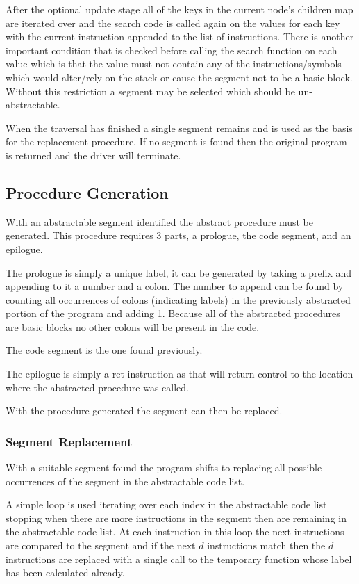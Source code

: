 \documentclass[9pt,nocopyrightspace]{sigplanconf}
\begin{document}
After the optional update stage all of the keys in the current node's children map are iterated over and the search code is called again on the values for each key with the current instruction appended to the list of instructions.
There is another important condition that is checked before calling the search function on each value which is that the value must not contain any of the instructions/symbols which would alter/rely on the stack or cause the segment not to be a basic block.
Without this restriction a segment may be selected which should be un-abstractable.

When the traversal has finished a single segment remains and is used as the basis for the replacement procedure.
If no segment is found then the original program is returned and the driver will terminate.

\subsection{Procedure Generation}

With an abstractable segment identified the abstract procedure must be generated.
This procedure requires 3 parts, a prologue, the code segment, and an epilogue.

The prologue is simply a unique label, it can be generated by taking a prefix and appending to it a number and a colon.
The number to append can be found by counting all occurrences of colons (indicating labels) in the previously abstracted portion of the program and adding 1.
Because all of the abstracted procedures are basic blocks no other colons will be present in the code.

The code segment is the one found previously.

The epilogue is simply a ret instruction as that will return control to the location where the abstracted procedure was called.

With the procedure generated the segment can then be replaced.

\subsubsection{Segment Replacement}

With a suitable segment found the program shifts to replacing all possible occurrences of the segment in the abstractable code list.

A simple loop is used iterating over each index in the abstractable code list stopping when there are more instructions in the segment then are remaining in the abstractable code list.
At each instruction in this loop the next instructions are compared to the segment and if the next $d$ instructions match then the $d$ instructions are replaced with a single call to the temporary function whose label has been calculated already.
\end{document}
